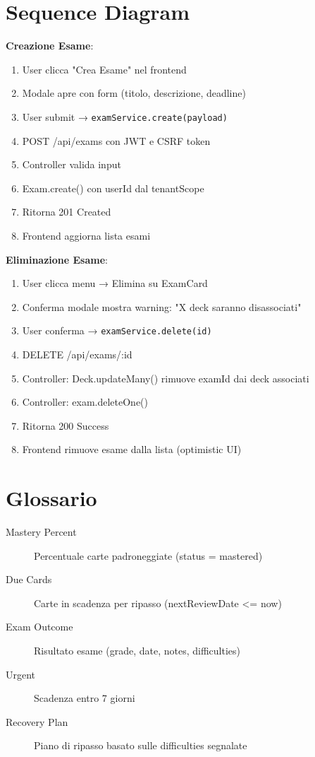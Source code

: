 \documentclass[11pt,a4paper]{article}
\begin{document}
\appendix
\section{Sequence Diagram}

\textbf{Creazione Esame}:
\begin{enumerate}
    \item User clicca "Crea Esame" nel frontend
    \item Modale apre con form (titolo, descrizione, deadline)
    \item User submit → \texttt{examService.create(payload)}
    \item POST /api/exams con JWT e CSRF token
    \item Controller valida input
    \item Exam.create() con userId dal tenantScope
    \item Ritorna 201 Created
    \item Frontend aggiorna lista esami
\end{enumerate}

\textbf{Eliminazione Esame}:
\begin{enumerate}
    \item User clicca menu → Elimina su ExamCard
    \item Conferma modale mostra warning: "X deck saranno disassociati"
    \item User conferma → \texttt{examService.delete(id)}
    \item DELETE /api/exams/:id
    \item Controller: Deck.updateMany() rimuove examId dai deck associati
    \item Controller: exam.deleteOne()
    \item Ritorna 200 Success
    \item Frontend rimuove esame dalla lista (optimistic UI)
\end{enumerate}

\section{Glossario}

\begin{description}
    \item[Mastery Percent] Percentuale carte padroneggiate (status = mastered)
    \item[Due Cards] Carte in scadenza per ripasso (nextReviewDate <= now)
    \item[Exam Outcome] Risultato esame (grade, date, notes, difficulties)
    \item[Urgent] Scadenza entro 7 giorni
    \item[Recovery Plan] Piano di ripasso basato sulle difficulties segnalate
\end{description}
\end{document}

